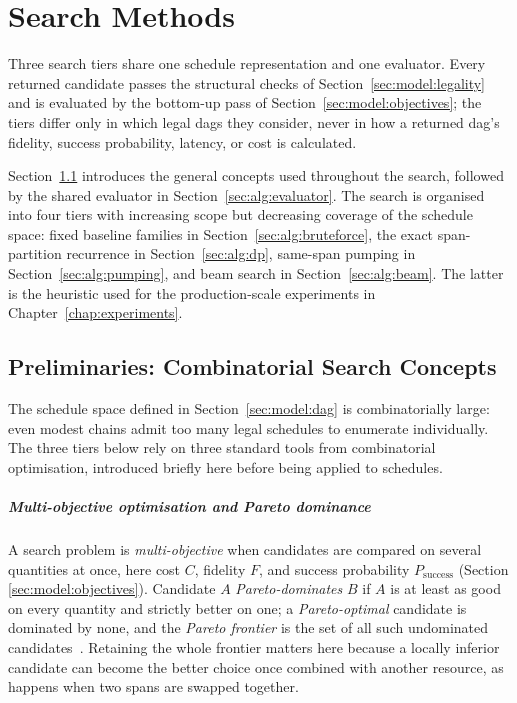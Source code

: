 \chapter{Search Methods}
\label{chap:algorithms}


Three search tiers share one schedule representation and one evaluator. Every returned candidate passes the structural checks of Section~\ref{sec:model:legality} and is evaluated by the bottom-up pass of Section~\ref{sec:model:objectives}; the tiers differ only in which legal \Glspl{dag} they consider, never in how a returned \Gls{dag}'s fidelity, success probability, latency, or cost is calculated.

Section~\ref{sec:alg:prelims} introduces the general concepts used throughout the search, followed by the shared evaluator in Section~\ref{sec:alg:evaluator}. The search is organised into four tiers with increasing scope but decreasing coverage of the schedule space: fixed baseline families in Section~\ref{sec:alg:bruteforce}, the exact span-partition recurrence in Section~\ref{sec:alg:dp}, same-span pumping in Section~\ref{sec:alg:pumping}, and beam search in Section~\ref{sec:alg:beam}. The latter is the heuristic used for the production-scale experiments in Chapter~\ref{chap:experiments}.

\section{Preliminaries: Combinatorial Search Concepts}
\label{sec:alg:prelims}

The schedule space defined in Section~\ref{sec:model:dag} is combinatorially large: even modest chains admit too many legal schedules to enumerate individually. The three tiers below rely on three standard tools from combinatorial optimisation, introduced briefly here before being applied to schedules.

\vspace{0.5cm}

\paragraph{Multi-objective optimisation and Pareto dominance} A search problem is \emph{multi-objective} when candidates are compared on several quantities at once, here cost $C$, fidelity $F$, and success probability $P_{\mathrm{success}}$ (Section \ref{sec:model:objectives}). Candidate $A$ \emph{Pareto-dominates} $B$ if $A$ is at least as good on every quantity and strictly better on one; a \emph{Pareto-optimal} candidate is dominated by none, and the \emph{Pareto frontier} is the set of all such undominated candidates~\cite{Pareto2014Manual,Deb2002Fast,Ehrgott2005Multicriteria}. Retaining the whole frontier matters here because a locally inferior candidate can become the better choice once combined with another resource, as happens when two spans are swapped together.

